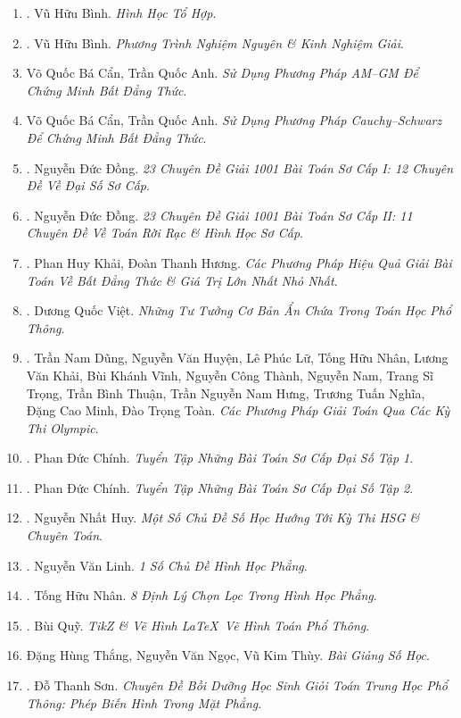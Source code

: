 \documentclass{article}
\begin{document}
\begin{enumerate}
	\item \cite{Binh_HHTH}. Vũ Hữu Bình. \textit{Hình Học Tổ Hợp}.\hfill{\sf[reading]}
	\item \cite{Binh_PTNN}. Vũ Hữu Bình. \textit{Phương Trình Nghiệm Nguyên \& Kinh Nghiệm Giải}.\hfill{\sf[reading]}
	\item Võ Quốc Bá Cẩn, Trần Quốc Anh. \textit{Sử Dụng Phương Pháp AM--GM Để Chứng Minh Bất Đẳng Thức}.
	\item Võ Quốc Bá Cẩn, Trần Quốc Anh. \textit{Sử Dụng Phương Pháp Cauchy--Schwarz Để Chứng Minh Bất Đẳng Thức}.
	\item \cite{Dong_23_1001_toan_I}. Nguyễn Đức Đồng. \textit{23 Chuyên Đề Giải 1001 Bài Toán Sơ Cấp I: 12 Chuyên Đề Về Đại Số Sơ Cấp}.\hfill{\sf[reading]}
	\item \cite{Dong_23_1001_toan_II}. Nguyễn Đức Đồng. \textit{23 Chuyên Đề Giải 1001 Bài Toán Sơ Cấp II: 11 Chuyên Đề Về Toán Rời Rạc \& Hình Học Sơ Cấp}.\hfill{\sf[reading]}
	\item \cite{Khai_Huong_bdt}. Phan Huy Khải, Đoàn Thanh Hương. \textit{Các Phương Pháp Hiệu Quả Giải Bài Toán Về Bất Đẳng Thức \& Giá Trị Lớn Nhất Nhỏ Nhất}.\hfill{\sf[reading]}
	\item \cite{Viet2014}. Dương Quốc Việt. \textit{Những Tư Tưởng Cơ Bản Ẩn Chứa Trong Toán Học Phổ Thông}.\hfill{\sf[finished]}
	\item \cite{Dung_cac_phuong_phap_giai_toan_qua_cac_ky_thi_olympic_2022}. Trần Nam Dũng, Nguyễn Văn Huyện, Lê Phúc Lữ, Tống Hữu Nhân, Lương Văn Khải, Bùi Khánh Vĩnh, Nguyễn Công Thành, Nguyễn Nam, Trang Sĩ Trọng, Trần Bình Thuận, Trần Nguyễn Nam Hưng, Trương Tuấn Nghĩa, Đặng Cao Minh, Đào Trọng Toàn. \textit{Các Phương Pháp Giải Toán Qua Các Kỳ Thi Olympic}.\hfill{\sf[reading]}
	\item \cite{Chinh2021_tap_1}. Phan Đức Chính. \textit{Tuyển Tập Những Bài Toán Sơ Cấp Đại Số Tập 1}.\hfill{\sf[reading]}
	\item \cite{Chinh2021_tap_2}. Phan Đức Chính. \textit{Tuyển Tập Những Bài Toán Sơ Cấp Đại Số Tập 2}.\hfill{\sf[reading]}
	\item \cite{Huy2022}. Nguyễn Nhất Huy. \textit{Một Số Chủ Đề Số Học Hướng Tới Kỳ Thi HSG \& Chuyên Toán}.\hfill{\sf[reading]}
	\item \cite{Linh_topic_geometry}. Nguyễn Văn Linh. \textit{1 Số Chủ Đề Hình Học Phẳng}.\hfill{\sf[reading]}
	\item \cite{Nhan_8_geometry_theorem}. Tống Hữu Nhân. \textit{8 Định Lý Chọn Lọc Trong Hình Học Phẳng}.\hfill{\sf[reading]}
	\item \cite{Quy2022}. Bùi Quỹ. \textit{TikZ \& Vẽ Hình \LaTeX\ Vẽ Hình Toán Phổ Thông}.\hfill{\sf[reading]}
	\item Đặng Hùng Thắng, Nguyễn Văn Ngọc, Vũ Kim Thùy. \textit{Bài Giảng Số Học}.
	\item \cite{Son2006}. Đỗ Thanh Sơn. \textit{Chuyên Đề Bồi Dưỡng Học Sinh Giỏi Toán Trung Học Phổ Thông: Phép Biến Hình Trong Mặt Phẳng}.\hfill{\sf[reading]}	
\end{enumerate}
\end{document}
